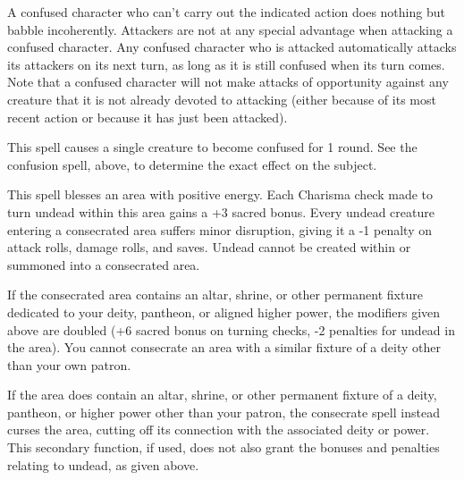 \begin{multicols}{2}
\begin{small}
\smallskip\noindent A confused character who can't carry out the indicated action does nothing but babble incoherently. Attackers are not at any special advantage when attacking a confused character. Any confused character who is attacked automatically attacks its attackers on its next turn, as long as it is still confused when its turn comes. Note that a confused character will not make attacks of opportunity against any creature that it is not already devoted to attacking (either because of its most recent action or because it has just been attacked).


\noindent This spell causes a single creature to become confused for 1 round. See the confusion spell, above, to determine the exact effect on the subject.

\noindent This spell blesses an area with positive energy. Each Charisma check made to turn undead within this area gains a +3 sacred bonus. Every undead creature entering a consecrated area suffers minor disruption, giving it a -1 penalty on attack rolls, damage rolls, and saves. Undead cannot be created within or summoned into a consecrated area.

\smallskip\noindent If the consecrated area contains an altar, shrine, or other permanent fixture dedicated to your deity, pantheon, or aligned higher power, the modifiers given above are doubled (+6 sacred bonus on turning checks, -2 penalties for undead in the area). You cannot consecrate an area with a similar fixture of a deity other than your own patron.

\smallskip\noindent If the area does contain an altar, shrine, or other permanent fixture of a deity, pantheon, or higher power other than your patron, the consecrate spell instead curses the area, cutting off its connection with the associated deity or power. This secondary function, if used, does not also grant the bonuses and penalties relating to undead, as given above.


\end{small}
\end{multicols}
